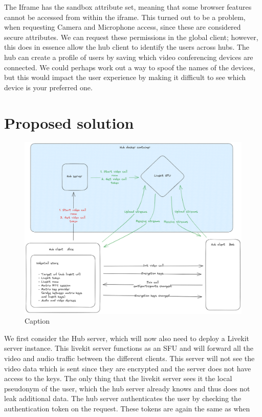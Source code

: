 \documentclass{report}
\begin{document}
The Iframe has the sandbox attribute set, meaning that some browser features cannot be accessed from within the iframe. This turned out to be a problem, when requesting Camera and Microphone access, since these are considered secure attributes. We can request these permissions in the global client; however, this does in essence allow the hub client to identify the users across hubs. The hub can create a profile of users by saving which video conferencing devices are connected. We could perhaps work out a way to spoof the names of the devices, but this would impact the user experience by making it difficult to see which device is your preferred one.



\chapter{Proposed solution}

\begin{figure}
    \centering
    \includegraphics[width=\textwidth]{Master thesis/img/PH_videocall.excalidraw.png}
    \caption{Caption}
    \label{fig:enter-label}
\end{figure}
We first consider the Hub server, which will now also need to deploy a Livekit server instance. This livekit server functions as an SFU and will forward all the video and audio traffic between the different clients. This server will not see the video data which is sent since they are encrypted and the server does not have access to the keys. The only thing that the livekit server sees it the local pseudonym of the user, which the hub server already knows and thus does not leak additional data. The hub server authenticates the user by checking the authentication token on the request. These tokens are again the same as when 
\end{document}
